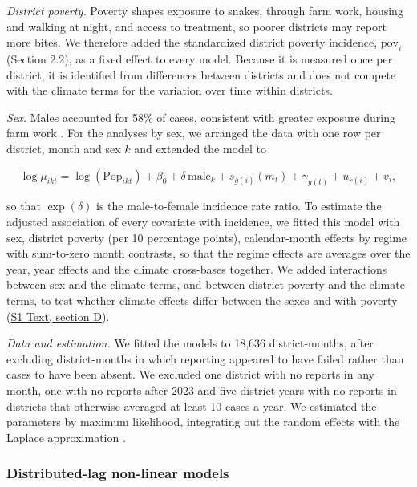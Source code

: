 \documentclass[11pt,a4paper]{article}
\begin{document}
\emph{District poverty.} Poverty shapes exposure to snakes, through farm work, housing and walking at night, and access to treatment, so poorer districts may report more bites. We therefore added the standardized district poverty incidence, \(\text{pov}_i\) (Section 2.2), as a fixed effect to every model. Because it is measured once per district, it is identified from differences between districts and does not compete with the climate terms for the variation over time within districts.

\emph{Sex.} Males accounted for 58\% of cases, consistent with greater exposure during farm work \cite{ref6}. For the analyses by sex, we arranged the data with one row per district, month and sex \(k\) and extended the model to

\[\log \mu_{ikt} = \log(\text{Pop}_{ikt}) + \beta_0 + \delta\,\text{male}_k + s_{g(i)}(m_t) + \gamma_{y(t)} + u_{r(i)} + v_i,\]

so that \(\exp(\delta)\) is the male-to-female incidence rate ratio. To estimate the adjusted association of every covariate with incidence, we fitted this model with sex, district poverty (per 10 percentage points), calendar-month effects by regime with sum-to-zero month contrasts, so that the regime effects are averages over the year, year effects and the climate cross-bases together. We added interactions between sex and the climate terms, and between district poverty and the climate terms, to test whether climate effects differ between the sexes and with poverty (\hyperref[s1text-d]{S1 Text, section D}).

\emph{Data and estimation.} We fitted the models to 18,636 district-months, after excluding district-months in which reporting appeared to have failed rather than cases to have been absent. We excluded one district with no reports in any month, one with no reports after 2023 and five district-years with no reports in districts that otherwise averaged at least 10 cases a year. We estimated the parameters by maximum likelihood, integrating out the random effects with the Laplace approximation \cite{ref32,ref35}.

\subsubsection{Distributed-lag non-linear models}
\end{document}
